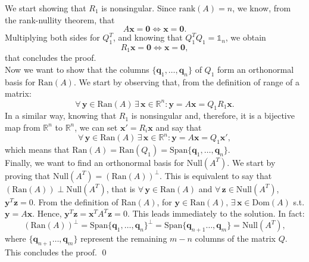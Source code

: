 \documentclass[a4paper,11pt]{article}
\newcommand{\R}{\mathbb{R}}
\begin{document}
\noindent We start showing that $R_1$ is nonsingular. Since $\text{rank}(A)=n$, we know, from the rank-nullity theorem, that
\begin{equation}\label{key}
	A \textbf{x} = \textbf{0} \Leftrightarrow \textbf{x} = \textbf{0}.
\end{equation}
Multiplying both sides for $Q_1^T$, and knowing that $Q_1^T Q_1 = \mathbb{1}_n$, we obtain
\begin{equation}
	R_1 \textbf{x} = \textbf{0} \Leftrightarrow \textbf{x} = \textbf{0},
\end{equation}
that concludes the proof.\\
Now we want to show that the columns $\{\textbf{q}_1, \dots , \textbf{q}_n\}$ of $Q_1$ form an orthonormal basis for $\text{Ran}(A)$. We start by observing that, from the definition of range of a matrix:
\begin{equation}\label{key}
	\forall \, \textbf{y} \in \text{Ran}(A)\, \exists \, \textbf{x} \in \R^n : \textbf{y} = A \textbf{x} = Q_1R_1\textbf{x}.
\end{equation}
In a similar way, knowing that $R_1$ is nonsingular and, therefore, it is a bijective map from $\R^n$ to $\R^n$, we can set $\textbf{x}' = R_i \textbf{x}$ and say that
\begin{equation}\label{key}
	\forall \, \textbf{y} \in \text{Ran}(A) \, \exists \, \textbf{x} \in \R^n : \textbf{y} = A \textbf{x} = Q_1\textbf{x}',
\end{equation}
which means that $\text{Ran}(A) = \text{Ran}(Q_1) = \text{Span}\{\textbf{q}_1,\dots,\textbf{q}_n\}$.\\
Finally, we want to find an orthonormal basis for $\text{Null}(A^T)$. We start by proving that $\text{Null}(A^T) = (\text{Ran}(A))^\perp$. This is equivalent to say that $(\text{Ran}(A)) \perp \text{Null}(A^T)$, that is $\forall \, \textbf{y} \in \text{Ran}(A)$ and $\forall \, \textbf{z} \in \text{Null}(A^{T})$, $\textbf{y}^{T}\textbf{z}=0$. From the definition of Ran$(A)$, for $\textbf{y}\in \text{Ran}(A), \, \exists \, \textbf{x} \in \text{Dom}(A)$ s.t. $\textbf{y}=A\textbf{x}$. Hence, $\textbf{y}^{T}\textbf{z} = \textbf{x}^{T}A^{T}\textbf{z}=0$. This leads immediately to the solution.
In fact:
\begin{equation}\label{key}
	(\text{Ran}(A))^\perp = \text{Span}\{\textbf{q}_1,\dots,\textbf{q}_n\}^\perp = \text{Span}\{\textbf{q}_{n+1}\dots,\textbf{q}_m\} =\text{Null}(A^{T}),
\end{equation}
where $\{\textbf{q}_{n+1}\dots,\textbf{q}_m\}$ represent the remaining $m-n$ columns of the matrix $Q$. This concludes the proof. \qed\\
\end{document}

